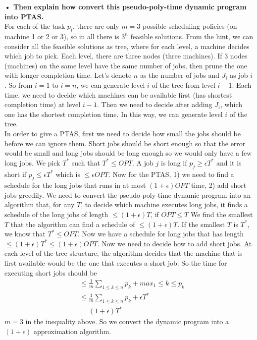 \documentclass{article}
\begin{document}
\textbf{• Then explain how convert this pseudo-poly-time dynamic program into PTAS.}\\ \newline
For each of the task $p_i$, there are only $m = 3$ possible scheduling policies (on machine 1 or 2 or 3), so in all there is $3^n$ feasible solutions. From the hint, we can consider all the feasible solutions as tree, where for each level, a machine decides which job to pick. Each level, there are three nodes (three machines). If 3 nodes (machines) on the same level have the same number of jobs, then prune the one with longer completion time. Let's denote $n$ as the number of jobs and $J_i$ as job $i$. So from $i = 1$ to $i = n$, we can generate level $i$ of the tree from level $i - 1$. Each time, we need to decide which machines can be available first (has shortest completion time) at level $i-1$. Then we need to decide after adding $J_i$, which one has the shortest completion time. In this way, we can generate level $i$ of the tree.  
\\ \newline
In order to give a PTAS, first we need to decide how small the jobs should be before we can ignore them. Short jobs should be short enough so that the error would be small and long jobs should be long enough so we would only have a few long jobs. We pick $T^*$ such that $T^* \leq OPT$. A job $j$ is long if $p_j \geq \epsilon T^*$ and it is short if  $p_j \leq \epsilon T^*$ which is $\leq \epsilon OPT$. Now for the PTAS, 1) we need to find a schedule for the long jobs that runs in at most $(1 + \epsilon)OPT$ time, 2) add short jobs greedily. We need to convert the pseudo-poly-time dynamic program into an algorithm that, for any $T$, to decide which machine executes long jobs, it finds a schedule of the long jobs of length $\leq (1 + \epsilon)T$, if $OPT \leq T$ We find the smallest $T$ that the algorithm can find a schedule of $\leq (1 + \epsilon)T$. If the smallest $T$ is $T^*$, we know that $T^* \leq OPT$. Now we have a schedule for long jobs that has length $\leq (1 + \epsilon)T^* \leq (1 + \epsilon)OPT$. Now we need to decide how to add short jobs. At each level of the tree structure, the algorithm decides that the machine that is first available would be the one that executes a short job. So the time for executing short jobs should be 
\begin{align}
    &\leq \frac{1}{m}\sum_{1\leq k \leq n}p_k + max_1\leq k \leq p_k \\
    & \leq \frac{1}{m}\sum_{1\leq k \leq n}p_k + \epsilon T^*\\
    & = (1 + \epsilon) T^*
\end{align}
$m = 3$ in the inequality above. So we convert the dynamic program into a $(1 + \epsilon)$ approximation algorithm. 
\end{document}
